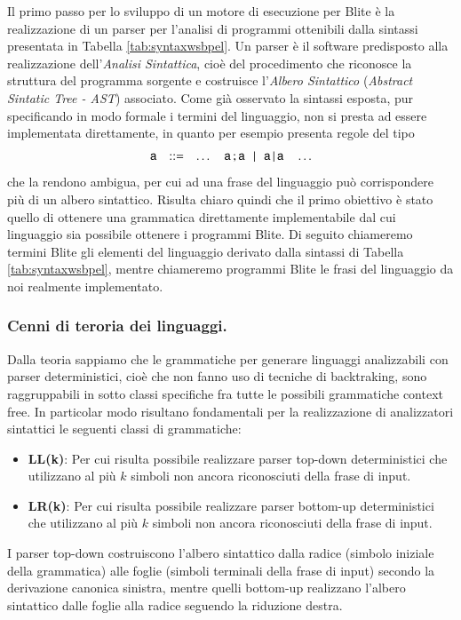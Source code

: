 Il primo passo per lo sviluppo di un motore di esecuzione per Blite è la
realizzazione di un parser per l'analisi di programmi ottenibili dalla sintassi
presentata in Tabella \ref{tab:syntaxwsbpel}. Un parser è il software predisposto
alla realizzazione dell'\emph{Analisi Sintattica}, cioè del procedimento che
riconosce la struttura del programma sorgente e costruisce l'\emph{Albero
Sintattico} (\emph{Abstract Sintatic Tree - AST}) associato. Come già osservato
la sintassi esposta, pur specificando in modo formale i termini del linguaggio,
non si presta ad essere implementata direttamente, in quanto per esempio
presenta regole del tipo 
$$
\begin{array}{rcl}
{\sf a} & ::= & \ldots \quad
{\sf a} \, ;{\sf a}  \!\!\quad | \quad\!\! {\sf a} \,|\, {\sf a} \quad \ldots 
\end{array}
$$
che la rendono ambigua, per cui ad una frase del linguaggio può corrispondere
più di un albero sintattico. Risulta chiaro quindi che il primo obiettivo è
stato quello di ottenere una grammatica direttamente implementabile 
dal cui linguaggio sia possibile ottenere i programmi Blite. Di seguito
chiameremo termini Blite gli elementi del linguaggio derivato dalla sintassi di
Tabella \ref{tab:syntaxwsbpel}, mentre chiameremo programmi Blite le frasi
del linguaggio da noi realmente implementato.
\\

\subsubsection{Cenni di teroria dei linguaggi.}
Dalla teoria sappiamo che le grammatiche per generare linguaggi
analizzabili con parser deterministici, cioè che non fanno uso di tecniche di
backtraking, sono raggruppabili in sotto classi specifiche fra tutte le
possibili grammatiche context free. In particolar modo risultano fondamentali
per la realizzazione di analizzatori sintattici le seguenti classi di
grammatiche:
\begin{itemize}
  \item \textbf{LL(k)}: Per cui risulta possibile realizzare parser top-down
  deterministici che utilizzano al più $k$ simboli non ancora riconosciuti
  della frase di input.
  \item \textbf{LR(k)}: Per cui risulta possibile realizzare parser bottom-up
  deterministici che utilizzano al più $k$ simboli non ancora riconosciuti
  della frase di input.
\end{itemize}

I parser top-down costruiscono l'albero sintattico dalla radice (simbolo
iniziale della grammatica) alle foglie (simboli terminali della frase di
input) secondo la derivazione canonica sinistra, mentre quelli bottom-up
realizzano l'albero sintattico dalle foglie alla radice seguendo la riduzione
destra. 

